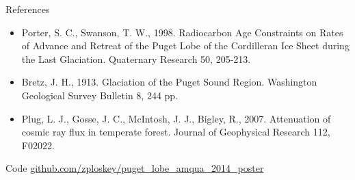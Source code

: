 \documentclass{beamer}
\begin{document}
\begin{frame}{}
\begin{columns}[T]
\begin{column}{.32\columnwidth}
\begin{block}{References}
{\begin{itemize}
\item Porter, S. C., Swanson, T. W., 1998. Radiocarbon Age Constraints on Rates of Advance and Retreat of the Puget Lobe of the Cordilleran Ice Sheet during the Last Glaciation. Quaternary Research 50, 205-213.

\item Bretz, J. H., 1913. Glaciation of the Puget Sound Region. Washington Geological Survey Bulletin 8, 244 pp.

\item Plug, L. J., Gosse, J. C., McIntosh, J. J., Bigley, R., 2007. Attenuation of cosmic ray flux in temperate forest. Journal of Geophysical Research 112, F02022.

\end{itemize}

} %
\end{block}

\begin{block}{Code}
	\center \url{github.com/zploskey/puget_lobe_amqua_2014_poster} 
	
\end{block}

\end{column}

\end{columns}

\end{frame}
\end{document}
